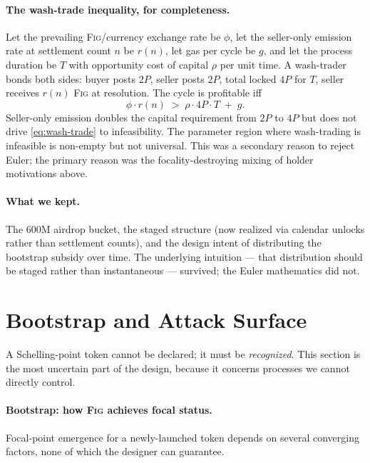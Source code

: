 \documentclass[11pt,a4paper]{article}
\theoremstyle{definition}
\theoremstyle{remark}
\newcommand{\fig}{\textsc{Fig}}
\newcommand{\pay}{P}
\begin{document}
\paragraph{The wash-trade inequality, for completeness.}
Let the prevailing \fig{}/currency exchange rate be $\phi$, let
the seller-only emission rate at settlement count $n$ be $r(n)$,
let gas per cycle be $g$, and let the process duration be $T$
with opportunity cost of capital $\rho$ per unit time. A
wash-trader bonds both sides: buyer posts $2\pay$, seller posts
$2\pay$, total locked $4\pay$ for $T$, seller receives $r(n)$
\fig{} at resolution. The cycle is profitable iff
\begin{equation}
  \phi \cdot r(n) \;>\; \rho \cdot 4\pay \cdot T \;+\; g.
  \label{eq:wash-trade}
\end{equation}
Seller-only emission doubles the capital requirement from
$2\pay$ to $4\pay$ but does not drive \eqref{eq:wash-trade} to
infeasibility. The parameter region where wash-trading is
infeasible is non-empty but not universal. This was a secondary
reason to reject Euler; the primary reason was the
focality-destroying mixing of holder motivations above.

\paragraph{What we kept.}
The 600M airdrop bucket, the staged structure (now realized via
calendar unlocks rather than settlement counts), and the design
intent of distributing the bootstrap subsidy over time. The
underlying intuition --- that distribution should be staged
rather than instantaneous --- survived; the Euler mathematics
did not.

\section{Bootstrap and Attack Surface}
\label{sec:bootstrap}

A Schelling-point token cannot be declared; it must be
\emph{recognized}. This section is the most uncertain part of
the design, because it concerns processes we cannot directly
control.

\paragraph{Bootstrap: how \fig{} achieves focal status.}
Focal-point emergence for a newly-launched token depends on
several converging factors, none of which the designer can
guarantee.
\end{document}
